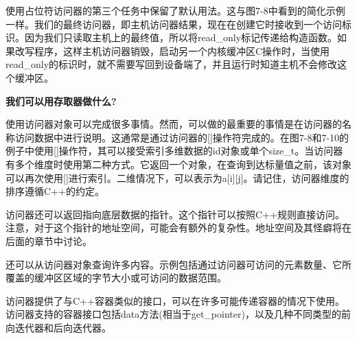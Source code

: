 使用占位符访问器的第三个任务中保留了默认用法。这与图7-8中看到的简化示例一样。我们的最终访问器，即主机访问器结果，现在在创建它时接收到一个访问标识。因为我们只读取主机上的最终值，所以将read\_only标记传递给构造函数。如果改写程序，这样主机访问器销毁，启动另一个内核缓冲区C操作时，当使用read\_only的标识时，就不需要写回到设备端了，并且运行时知道主机不会修改这个缓冲区。\par

\hspace*{\fill} \par %
\textbf{我们可以用存取器做什么?}

使用访问器对象可以完成很多事情。然而，可以做的最重要的事情是在访问器的名称访问数据中进行说明。这通常是通过访问器的[]操作符完成的。在图7-8和7-10的例子中使用[]操作符，其可以接受索引多维数据的id对象或单个size\_t。当访问器有多个维度时使用第二种方式。它返回一个对象，在查询到达标量值之前，该对象可以再次使用[]进行索引。二维情况下，可以表示为a[i][j]。请记住，访问器维度的排序遵循C++的约定。\par

访问器还可以返回指向底层数据的指针。这个指针可以按照C++规则直接访问。注意，对于这个指针的地址空间，可能会有额外的复杂性。地址空间及其怪癖将在后面的章节中讨论。\par

还可以从访问器对象查询许多内容。示例包括通过访问器可访问的元素数量、它所覆盖的缓冲区区域的字节大小或可访问的数据范围。\par

访问器提供了与C++容器类似的接口，可以在许多可能传递容器的情况下使用。访问器支持的容器接口包括data方法(相当于get\_pointer)，以及几种不同类型的前向迭代器和后向迭代器。\par










































